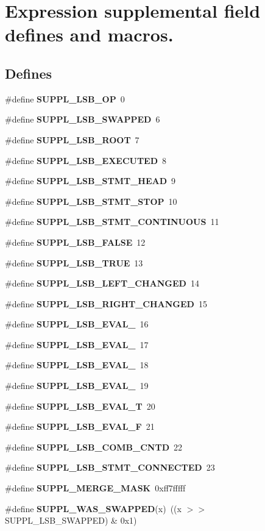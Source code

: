 \section{Expression supplemental field defines and macros.}
\label{group__expr__suppl}
\subsection*{Defines}
\begin{CompactItemize}
\item 
\#define {\bf SUPPL\_\-LSB\_\-OP}\ 0
\item 
\#define {\bf SUPPL\_\-LSB\_\-SWAPPED}\ 6
\item 
\#define {\bf SUPPL\_\-LSB\_\-ROOT}\ 7
\item 
\#define {\bf SUPPL\_\-LSB\_\-EXECUTED}\ 8
\item 
\#define {\bf SUPPL\_\-LSB\_\-STMT\_\-HEAD}\ 9
\item 
\#define {\bf SUPPL\_\-LSB\_\-STMT\_\-STOP}\ 10
\item 
\#define {\bf SUPPL\_\-LSB\_\-STMT\_\-CONTINUOUS}\ 11
\item 
\#define {\bf SUPPL\_\-LSB\_\-FALSE}\ 12
\item 
\#define {\bf SUPPL\_\-LSB\_\-TRUE}\ 13
\item 
\#define {\bf SUPPL\_\-LSB\_\-LEFT\_\-CHANGED}\ 14
\item 
\#define {\bf SUPPL\_\-LSB\_\-RIGHT\_\-CHANGED}\ 15
\item 
\#define {\bf SUPPL\_\-LSB\_\-EVAL\_}\ 16
\item 
\#define {\bf SUPPL\_\-LSB\_\-EVAL\_}\ 17
\item 
\#define {\bf SUPPL\_\-LSB\_\-EVAL\_}\ 18
\item 
\#define {\bf SUPPL\_\-LSB\_\-EVAL\_}\ 19
\item 
\#define {\bf SUPPL\_\-LSB\_\-EVAL\_\-T}\ 20
\item 
\#define {\bf SUPPL\_\-LSB\_\-EVAL\_\-F}\ 21
\item 
\#define {\bf SUPPL\_\-LSB\_\-COMB\_\-CNTD}\ 22
\item 
\#define {\bf SUPPL\_\-LSB\_\-STMT\_\-CONNECTED}\ 23
\item 
\#define {\bf SUPPL\_\-MERGE\_\-MASK}\ 0xff7fffff
\item 
\#define {\bf SUPPL\_\-WAS\_\-SWAPPED}(x)\ ((x $>$$>$ SUPPL\_\-LSB\_\-SWAPPED) \& 0x1)
\item 
$$
\end{CompactItemize}
